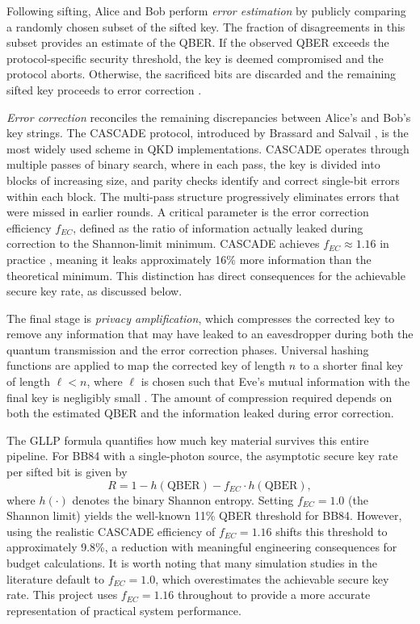 \documentclass[10pt, a4paper]{report}
\begin{document}
Following sifting, Alice and Bob perform \textit{error estimation} by publicly comparing a randomly chosen subset of the sifted key. The fraction of disagreements in this subset provides an estimate of the QBER. If the observed QBER exceeds the protocol-specific security threshold, the key is deemed compromised and the protocol aborts. Otherwise, the sacrificed bits are discarded and the remaining sifted key proceeds to error correction \cite{Scarani2009}.

\textit{Error correction} reconciles the remaining discrepancies between Alice's and Bob's key strings. The CASCADE protocol, introduced by Brassard and Salvail \cite{Cascade1994}, is the most widely used scheme in QKD implementations. CASCADE operates through multiple passes of binary search, where in each pass, the key is divided into blocks of increasing size, and parity checks identify and correct single-bit errors within each block. The multi-pass structure progressively eliminates errors that were missed in earlier rounds. A critical parameter is the error correction efficiency $f_{EC}$, defined as the ratio of information actually leaked during correction to the Shannon-limit minimum. CASCADE achieves $f_{EC} \approx 1.16$ in practice \cite{Cascade1994}, meaning it leaks approximately 16\% more information than the theoretical minimum. This distinction has direct consequences for the achievable secure key rate, as discussed below.

The final stage is \textit{privacy amplification}, which compresses the corrected key to remove any information that may have leaked to an eavesdropper during both the quantum transmission and the error correction phases. Universal hashing functions are applied to map the corrected key of length $n$ to a shorter final key of length $\ell < n$, where $\ell$ is chosen such that Eve's mutual information with the final key is negligibly small \cite{Bennett1995PA}. The amount of compression required depends on both the estimated QBER and the information leaked during error correction.

The GLLP formula \cite{GLLP2004} quantifies how much key material survives this entire pipeline. For BB84 with a single-photon source, the asymptotic secure key rate per sifted bit is given by
%
\begin{equation}
\label{eq:gllp}
R = 1 - h(\text{QBER}) - f_{EC} \cdot h(\text{QBER}),
\end{equation}
%
where $h(\cdot)$ denotes the binary Shannon entropy. Setting $f_{EC} = 1.0$ (the Shannon limit) yields the well-known 11\% QBER threshold for BB84. However, using the realistic CASCADE efficiency of $f_{EC} = 1.16$ shifts this threshold to approximately 9.8\%, a reduction with meaningful engineering consequences for budget calculations. It is worth noting that many simulation studies in the literature default to $f_{EC} = 1.0$, which overestimates the achievable secure key rate. This project uses $f_{EC} = 1.16$ throughout to provide a more accurate representation of practical system performance.
\end{document}

